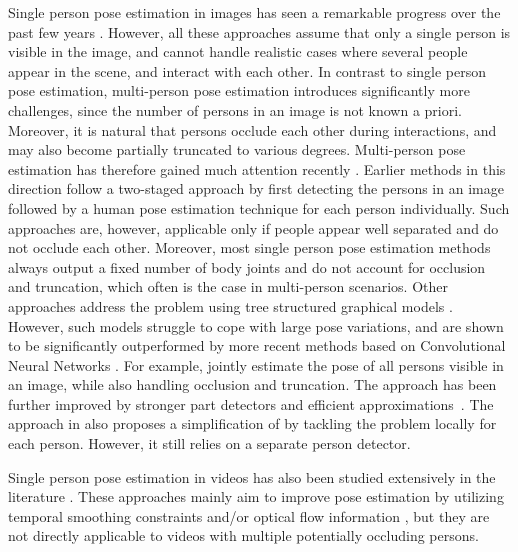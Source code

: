 \documentclass[10pt,twocolumn,letterpaper]{article}
\begin{document}
Single person pose estimation in images has seen a remarkable progress over the past few years \cite{toshev2014deeppose, pishchulin2016deepcut, carreira2015human, wei2016convolutional, hu2016bottom, insafutdinov2016deepercut, newell2016eccv, bulat2016human, rafi2016bmvc}. However, all these approaches assume that only a single person is visible in the image, and cannot handle realistic cases where several people appear in the scene, and interact with each other. In contrast to single person pose estimation, multi-person pose estimation introduces significantly more challenges, since the number of persons in an image is not known a priori. Moreover, it is natural that persons occlude each other during interactions, and may also become partially truncated to various degrees. Multi-person pose estimation has therefore gained much attention recently \cite{eichner2010we, sun2011articulated, pishchulin2012articulated, yang_tpami2014, Ladicky_2013_CVPR, gkioxari2014using, chen2015parsing, belagiannis2015tpami, pishchulin2016deepcut, insafutdinov2016deepercut, Iqbal_ECCVw2016}. Earlier methods in this direction follow a two-staged approach \cite{pishchulin2012articulated, gkioxari2014using, chen2015parsing} by first detecting the persons in an image followed by a human pose estimation technique for each person individually. Such approaches are, however, applicable only if people appear well separated and do not occlude each other. Moreover, most single person pose estimation methods always output a fixed number of body joints and do not account for occlusion and truncation, which often is the case in multi-person scenarios. Other approaches address the problem using tree structured graphical models \cite{yang_tpami2014, sun2011articulated, eichner2010we, Ladicky_2013_CVPR}. However, such models struggle to cope with large pose variations, and are shown to be significantly outperformed by more recent methods based on Convolutional Neural Networks \cite{pishchulin2016deepcut, insafutdinov2016deepercut}. For example, \cite{pishchulin2016deepcut} jointly estimate the pose of all persons visible in an image, while also handling occlusion and truncation. The approach has been further improved by stronger part detectors and efficient approximations~\cite{insafutdinov2016deepercut}. The approach in \cite{Iqbal_ECCVw2016} also proposes a simplification of \cite{pishchulin2016deepcut} by tackling the problem locally for each person. However, it still relies on a separate person detector. 

Single person pose estimation in videos has also been studied extensively in the literature \cite{park_iccv2011, cherian_cvpr2014, zuffi_iccv2013, ramakrishna_cvpr2013, zuffi_iccv2013,  jain_accv2014, dong2015iccv, Pfister15a, georgia2016eccv, iqbal2017FG}. These approaches mainly aim to improve pose estimation by utilizing temporal smoothing constraints \cite{park_iccv2011, cherian_cvpr2014, dong2015iccv, ramakrishna_cvpr2013, georgia2016eccv} and/or optical flow information \cite{zuffi_iccv2013, jain_accv2014, Pfister15a}, but they are not directly applicable to videos with multiple potentially occluding persons. 
\end{document}
